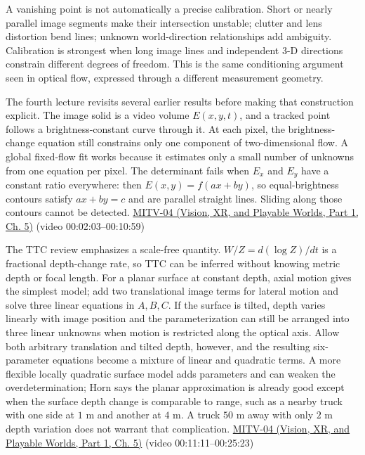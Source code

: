 A vanishing point is not automatically a precise calibration. Short or nearly parallel image segments make their intersection unstable; clutter and lens distortion bend lines; unknown world-direction relationships add ambiguity. Calibration is strongest when long image lines and independent 3-D directions constrain different degrees of freedom. This is the same conditioning argument seen in optical flow, expressed through a different measurement geometry.

The fourth lecture revisits several earlier results before making that construction explicit. The image solid is a video volume \(E(x,y,t)\), and a tracked point follows a brightness-constant curve through it. At each pixel, the brightness-change equation still constrains only one component of two-dimensional flow. A global fixed-flow fit works because it estimates only a small number of unknowns from one equation per pixel. The determinant fails when \(E_x\) and \(E_y\) have a constant ratio everywhere: then \(E(x,y)=f(ax+by)\), so equal-brightness contours satisfy \(ax+by=c\) and are parallel straight lines. Sliding along those contours cannot be detected. \href{../07-Vision-XR-and-Playable-Worlds-P01/main.pdf\#nameddest=04-visual-computing-ii-ch036-mitv-04---fixed-optical-flow-optical-mouse-constant-brightness-assumption-closed-form-solution}{MITV-04 (Vision, XR, and Playable Worlds, Part 1, Ch. 5)} (video 00:02:03--00:10:59)

The TTC review emphasizes a scale-free quantity. \(W/Z=d(\log Z)/dt\) is a fractional depth-change rate, so TTC can be inferred without knowing metric depth or focal length. For a planar surface at constant depth, axial motion gives the simplest model; add two translational image terms for lateral motion and solve three linear equations in \(A,B,C\). If the surface is tilted, depth varies linearly with image position and the parameterization can still be arranged into three linear unknowns when motion is restricted along the optical axis. Allow both arbitrary translation and tilted depth, however, and the resulting six-parameter equations become a mixture of linear and quadratic terms. A more flexible locally quadratic surface model adds parameters and can weaken the overdetermination; Horn says the planar approximation is already good except when the surface depth change is comparable to range, such as a nearby truck with one side at \(1\) m and another at \(4\) m. A truck \(50\) m away with only \(2\) m depth variation does not warrant that complication. \href{../07-Vision-XR-and-Playable-Worlds-P01/main.pdf\#nameddest=04-visual-computing-ii-ch036-mitv-04---fixed-optical-flow-optical-mouse-constant-brightness-assumption-closed-form-solution}{MITV-04 (Vision, XR, and Playable Worlds, Part 1, Ch. 5)} (video 00:11:11--00:25:23)

